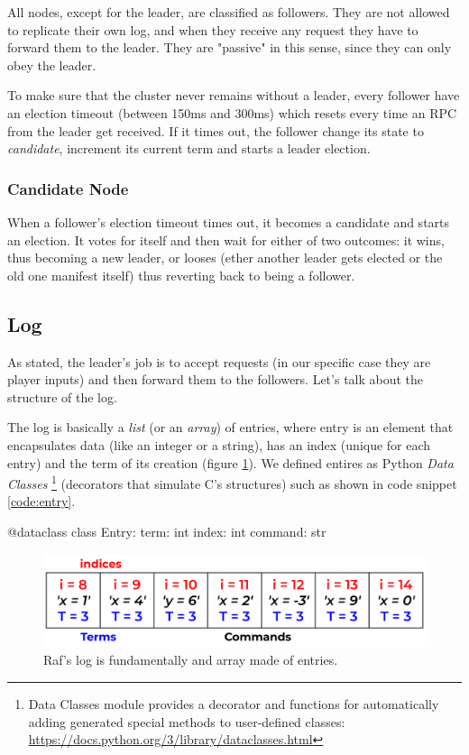 All nodes, except for the leader, are classified as followers. They are not allowed to replicate their own log, and when they receive any request they have to forward them to the leader. They are "passive" in this sense, since they can only obey the leader. 

To make sure that the cluster never remains without a leader, every follower have an election timeout (between 150ms and 300ms) which resets every time an RPC from the leader get received. If it times out, the follower change its state to \textit{candidate}, increment its current term and starts a leader election.

\subsubsection{Candidate Node}

When a follower's election timeout times out, it becomes a candidate and starts an election. It votes for itself and then wait for either of two outcomes: it wins, thus becoming a new leader, or looses (ether another leader gets elected or the old one manifest itself) thus reverting back to being a follower.

\subsection{Log}

As stated, the leader's job is to accept requests (in our specific case they are player inputs) and then forward them to the followers. Let's talk about the structure of the log. 

The log is basically a \textit{list} (or an \textit{array}) of entries, where entry is an element that encapsulates data (like an integer or a string), has an index (unique for each entry) and the term of its creation (figure \ref{fig:logStructure}). We defined entires as Python \textit{Data Classes} \footnote{Data Classes module provides a decorator and functions for automatically adding generated special methods to user-defined classes: \url{https://docs.python.org/3/library/dataclasses.html}} (decorators that simulate C's structures) such as shown in code snippet \ref{code:entry}.

\label{code:entry}
\begin{python} 
@dataclass
class Entry:
    term: int
    index: int
    command: str 
\end{python}

\begin{figure}[h]
  \centering
  \includegraphics[width=.8\linewidth]{images/logStructure.png}
  
  \caption{Raf's log is fundamentally and array made of entries.}
  \label{fig:logStructure}
\end{figure}

